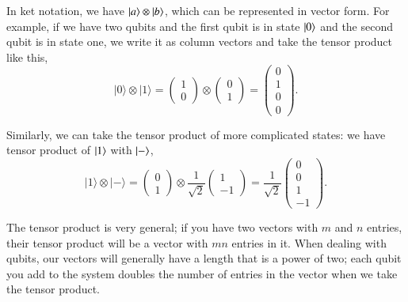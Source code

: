 In ket notation, we have $\left| a \right\rangle \otimes \left| b \right\rangle$, which can be represented in vector form. For example, if we have two qubits and the first qubit is in state $\left| 0 \right\rangle$ and the second qubit is in state one, we write it as column vectors and take the tensor product like this,
\begin{equation}
|0\rangle \otimes|1\rangle=\left(\begin{array}{l}
1 \\
0
\end{array}\right) \otimes\left(\begin{array}{l}
0 \\
1
\end{array}\right)=\left(\begin{array}{l}
0 \\
1 \\
0 \\
0
\end{array}\right).
\end{equation}

Similarly, we can take the tensor product of more complicated states: we have tensor product of $\left| 1 \right\rangle$ with $\left| - \right\rangle$,
\begin{equation}
|1\rangle \otimes|-\rangle=\left(\begin{array}{l}
0 \\
1
\end{array}\right) \otimes \frac{1}{\sqrt{2}}\left(\begin{array}{c}
1 \\
-1
\end{array}\right)=\frac{1}{\sqrt{2}}\left(\begin{array}{c}
0 \\
0 \\
1 \\
-1
\end{array}\right).
\end{equation}

The tensor product is very general; if you have two vectors with $m$ and $n$ entries, their tensor product will be a vector with $mn$ entries in it. When dealing with qubits, our vectors will generally have a length that is a power of two; each qubit you add to the system doubles the number of entries in the vector when we take the tensor product.

